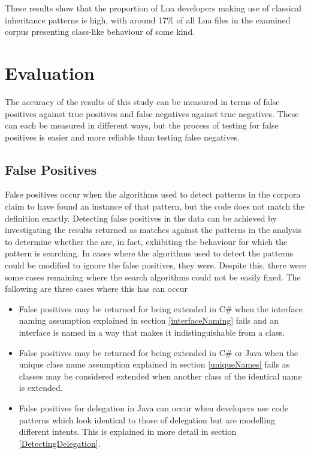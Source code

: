 These results show that the proportion of Lua developers making use of classical inheritance patterns is high, with around 17\% of all Lua files in the examined corpus presenting class-like behaviour of some kind.

\section{Evaluation}
The accuracy of the results of this study can be measured in terms of false positives against true positives and false negatives against true negatives. These can each be measured in different ways, but the process of testing for false positives is easier and more reliable than testing false negatives.

\subsection{False Positives}
\label{falsePositives}
False positives occur when the algorithms used to detect patterns in the corpora claim to have found an instance of that pattern, but the code does not match the definition exactly. Detecting false positives in the data can be achieved by investigating the results returned as matches against the patterns in the analysis to determine whether the are, in fact, exhibiting the behaviour for which the pattern is searching. In cases where the algorithms used to detect the patterns could be modified to ignore the false positives, they were. Despite this, there were some cases remaining where the search algorithms could not be easily fixed. The following are three cases where this has can occur
\begin{itemize}
	\item False positives may be returned for being extended in C\# when the interface naming assumption explained in section \ref{interfaceNaming} fails and an interface is named in a way that makes it indistinguishable from a class.
	\item False positives may be returned for being extended in C\# or Java when the unique class name assumption explained in section \ref{uniqueNames} fails as classes may be considered extended when another class of the identical name is extended.
	\item False positives for delegation in Java can occur when developers use code patterns which look identical to those of delegation but are modelling different intents. This is explained in more detail in section \ref{DetectingDelegation}.
\end{itemize} 

